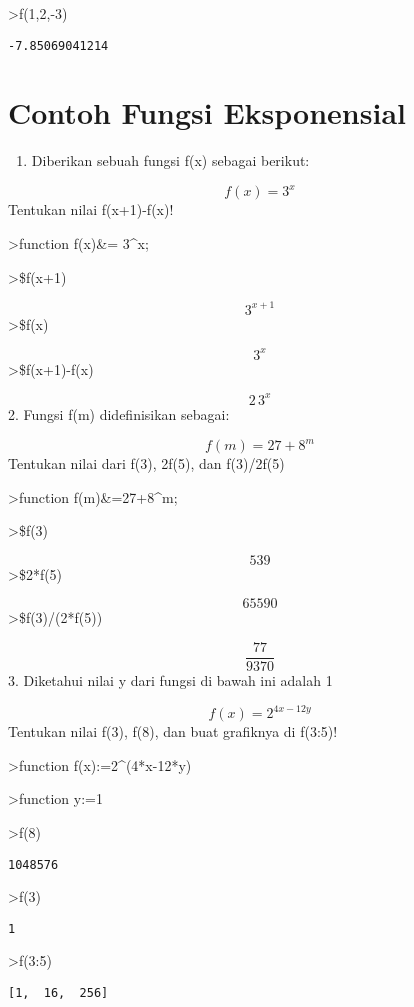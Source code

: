 \documentclass[
]{book}
\providecommand{\tightlist}{%
  \setlength{\itemsep}{0pt}\setlength{\parskip}{0pt}}
\begin{document}
\textgreater f(1,2,-3)

\begin{verbatim}
-7.85069041214
\end{verbatim}

\section{Contoh Fungsi Eksponensial}\label{contoh-fungsi-eksponensial}

\begin{enumerate}
\def\labelenumi{\arabic{enumi}.}
\tightlist
\item
  Diberikan sebuah fungsi f(x) sebagai berikut:
\end{enumerate}

\[f(x)=3^x\]Tentukan nilai f(x+1)-f(x)!

\textgreater function f(x)\&= 3\^{}x;

\textgreater\$f(x+1)

\[3^{x+1}\]\textgreater\$f(x)

\[3^{x}\]\textgreater\$f(x+1)-f(x)

\[2\,3^{x}\]2. Fungsi f(m) didefinisikan sebagai:

\[f(m)=27+8^m\]Tentukan nilai dari f(3), 2f(5), dan f(3)/2f(5)

\textgreater function f(m)\&=27+8\^{}m;

\textgreater\$f(3)

\[539\]\textgreater\$2*f(5)

\[65590\]\textgreater\$f(3)/(2*f(5))

\[\frac{77}{9370}\]3. Diketahui nilai y dari fungsi di bawah ini adalah 1

\[f(x)=2^{4x-12y}\]Tentukan nilai f(3), f(8), dan buat grafiknya di f(3:5)!

\textgreater function f(x):=2\^{}(4*x-12*y)

\textgreater function y:=1

\textgreater f(8)

\begin{verbatim}
1048576
\end{verbatim}

\textgreater f(3)

\begin{verbatim}
1
\end{verbatim}

\textgreater f(3:5)

\begin{verbatim}
[1,  16,  256]
\end{verbatim}
\end{document}
